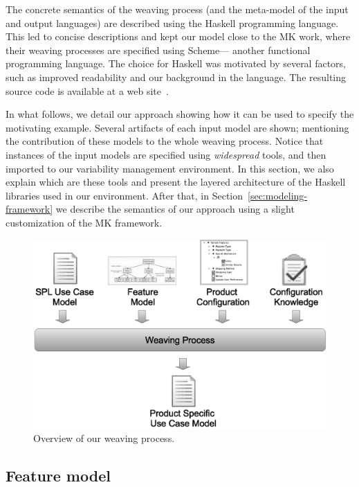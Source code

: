 \documentclass{acm_proc_article-sp}
\begin{document}
{\color{blue}The {\color{red}concrete semantics} of the weaving process (and the
meta-model of the input and output languages) are described using the Haskell
programming language. This led to concise descriptions and
kept our model close to the MK work, where their weaving processes are specified
using Scheme--- another functional programming language. The choice for Haskell was motivated by
several factors, such as improved readability and our background in the language.
The resulting source code is available at a web site~\cite{SPG:site}.}

In what follows, we detail our approach showing how it can be used to specify the
motivating example. Several artifacts of each input model are shown; mentioning
the contribution of these models to the whole weaving process. {\color{red}
Notice that instances of the input models are specified using  \emph{widespread} tools, and
then imported to our variability management environment. In this section, we also explain which are
these tools and present the layered architecture of the Haskell libraries used in our environment.} After
that, in Section~\ref{sec:modeling-framework} we describe the semantics of our
approach using a slight customization of the MK framework.

\begin{figure}[htb]
 \begin{center}
  \includegraphics[scale=0.30]{img/weave-process2.eps}
  \caption{Overview of our weaving process.}
  \label{fig:weave-process}
  \end{center}
\end{figure}

\subsection{Feature model}
\end{document}
